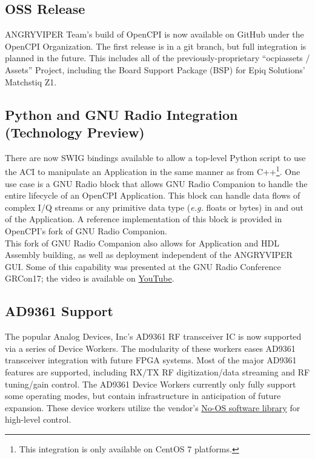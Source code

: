 \subsection{OSS Release} %
\label{sec:13_oss}
ANGRYVIPER Team's build of OpenCPI is now available on GitHub under the OpenCPI Organization. The first release is in a git branch, but full integration is planned in the future. This includes all of the previously-proprietary ``ocpiassets / Assets'' Project, including the Board Support Package (BSP) for Epiq Solutions' Matchstiq Z1.

\subsection{Python and GNU Radio Integration (Technology Preview)} %
There are now SWIG bindings available to allow a top-level Python script to use the ACI to manipulate an Application in the same manner as from C++\footnote{This integration is only available on CentOS 7 platforms.}. One use case is a GNU Radio block that allows GNU Radio Companion to handle the entire lifecycle of an OpenCPI Application. This block can handle data flows of complex I/Q streams or any primitive data type (\textit{e.g.} floats or bytes) in and out of the Application. A reference implementation of this block is provided in OpenCPI's fork of GNU Radio Companion.\\

This fork of GNU Radio Companion also allows for Application and HDL Assembly building, as well as deployment independent of the ANGRYVIPER GUI. Some of this capability was presented at the GNU Radio Conference GRCon17; the video is available on \href{https://www.youtube.com/watch?v=CriLitW5vtM}{YouTube}.

\subsection{AD9361 Support}
\label{sec:13_ad9361}
The popular Analog Devices, Inc's AD9361 RF transceiver IC is now supported via a series of Device Workers. The modularity of these workers eases AD9361 transceiver integration with future FPGA systems. Most of the major AD9361 features are supported, including RX/TX RF digitization/data streaming and RF tuning/gain control. The AD9361 Device Workers currently only fully support some operating modes, but contain infrastructure in anticipation of future expansion. These device workers utilize the vendor's \href{https://github.com/analogdevicesinc/no-os}{No-OS software library} for high-level control.\\

